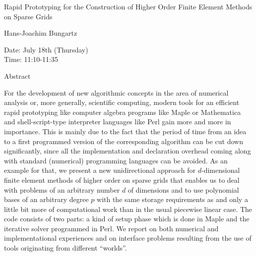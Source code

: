 \begin{center}
\LARGE
Rapid Prototyping for the Construction of Higher Order
           Finite Element Methods on Sparse Grids 

\end{center}

\begin{center}
\Large
Hans-Joachim Bungartz


\end{center}

\noindent
Date:  July 18th (Thursday)\\
Time:  11:10-11:35\\

\begin{center}
\large
Abstract
\end{center}

For the development of new algorithmic concepts in the area of numerical analysis or, more
generally, scientific computing, modern tools for an efficient rapid prototyping like computer
algebra programs like Maple or Mathematica and shell-script-type interpreter languages like Perl
gain more and more in importance. This is mainly due to the fact that the period of time from an
idea to a first programmed version of the corresponding algorithm can be cut down significantly,
since all the implementation and declaration overhead coming along with standard (numerical)
programming languages can be avoided. As an example for that, we present a new unidirectional
approach for $d$-dimensional finite element methods of higher order on sparse grids that enables
us to deal with problems of an arbitrary number $d$ of dimensions and to use polynomial bases of
an arbitrary degree $p$ with the same storage requirements as and only a little bit more of
computational work than in the usual piecewise linear case. The code consists of two parts: a kind
of setup phase which is done in Maple and the iterative solver programmed in Perl. We report on
both numerical and implementational experiences and on interface problems resulting from the use
of tools originating from different ``worlds''. 

